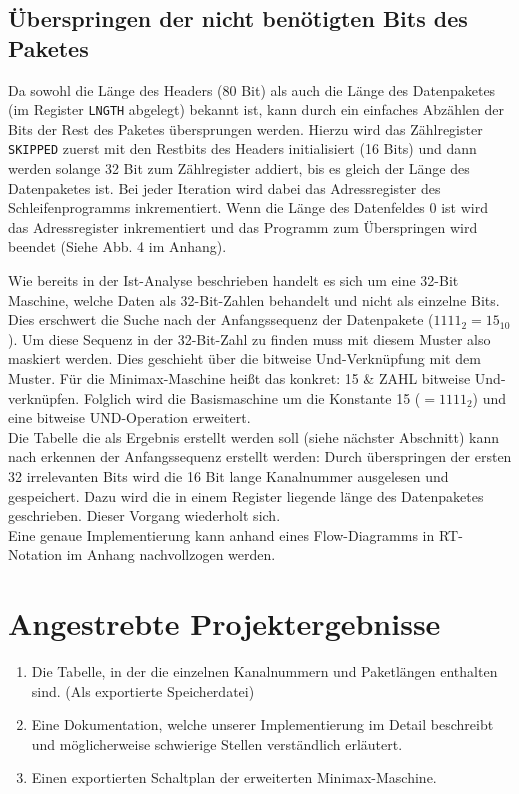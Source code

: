 \documentclass[12pt,titlepage]{article}
\begin{document}
\subsection{Überspringen der nicht benötigten Bits des Paketes}
Da sowohl die Länge des Headers (80 Bit) als auch die Länge des Datenpaketes (im Register \texttt{LNGTH} abgelegt) bekannt ist, kann durch
ein einfaches Abzählen der Bits der Rest des Paketes übersprungen werden. Hierzu wird das Zählregister \texttt{SKIPPED} zuerst mit den Restbits
des Headers initialisiert (16 Bits) und dann werden solange 32 Bit zum Zählregister addiert, bis es gleich der Länge des Datenpaketes ist. Bei
jeder Iteration wird dabei das Adressregister des Schleifenprogramms inkrementiert. Wenn die Länge des Datenfeldes 0 ist wird das Adressregister
inkrementiert und das Programm zum Überspringen wird beendet (Siehe Abb. 4 im Anhang).

Wie bereits in der Ist-Analyse beschrieben handelt es sich um eine 32-Bit Maschine, welche Daten als 32-Bit-Zahlen behandelt und nicht als 
einzelne Bits. Dies erschwert die Suche nach der Anfangssequenz der Datenpakete ($1111_{2} = 15_{10}$). Um diese Sequenz in der 32-Bit-Zahl
zu finden muss mit diesem Muster also maskiert werden. Dies geschieht {\"u}ber die bitweise Und-Verkn{\"u}pfung mit dem Muster. F{\"u}r die Minimax-Maschine
heißt das konkret: 15 \& ZAHL bitweise Und-verkn{\"u}pfen. Folglich wird die Basismaschine um die Konstante 15 ($=1111_{2}$) und eine bitweise UND-Operation
erweitert.\\
Die Tabelle die als Ergebnis erstellt werden soll (siehe n{\"a}chster Abschnitt) kann nach erkennen der Anfangssequenz erstellt werden:
Durch {\"u}berspringen der ersten 32 irrelevanten Bits wird die 16 Bit lange Kanalnummer ausgelesen und gespeichert. Dazu wird die in einem Register liegende l{\"a}nge des Datenpaketes geschrieben. Dieser Vorgang wiederholt sich.\\
Eine genaue Implementierung kann anhand eines Flow-Diagramms in RT-Notation im Anhang nachvollzogen werden.


\section{Angestrebte Projektergebnisse}
\begin{enumerate}
\item Die Tabelle, in der die einzelnen Kanalnummern und Paketl{\"a}ngen enthalten sind. (Als exportierte Speicherdatei)
\item Eine Dokumentation, welche unserer Implementierung im Detail beschreibt und m{\"o}glicherweise schwierige Stellen verst{\"a}ndlich erl{\"a}utert.
\item Einen exportierten Schaltplan der erweiterten Minimax-Maschine.
\end{enumerate}
\end{document}
